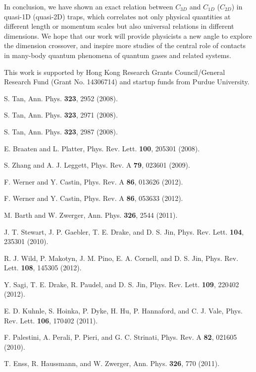 \documentclass[twocolumn, prl]{revtex4}
\begin{document}
In conclusion, we have shown an exact relation between $C_{3D}$ and $C_{1D}$ ($C_{2D}$) in quasi-1D (quasi-2D) traps, which correlates not only physical quantities at different length or momentum scales but also universal relations in different dimensions.  We hope that our work will provide physicists a new angle to explore the dimension crossover, and inspire more studies of the central role of contacts in many-body quantum phenomena of quantum gases and related systems.


This work is supported by Hong Kong Research Grants Council/General Research Fund (Grant No. 14306714) and startup funds from Purdue University.


\begin{thebibliography}{99}


 S. Tan, {Ann. Phys.} {\bf 323}, 2952 (2008).

 S. Tan, {Ann. Phys.} {\bf 323}, 2971 (2008).

 S. Tan, {Ann. Phys.} {\bf 323}, 2987 (2008).

 E. Braaten and L. Platter, {Phys. Rev. Lett.} {\bf 100}, 205301 (2008).

 S. Zhang and  A. J. Leggett, {Phys. Rev. A} {\bf 79}, 023601 (2009).

 F. Werner and Y. Castin, {Phys. Rev. A} {\bf 86}, 013626 (2012).

 F. Werner and Y. Castin, {Phys. Rev. A} {\bf 86}, 053633 (2012).

 M. Barth and W. Zwerger, {Ann. Phys.} {\bf 326}, 2544 (2011).

 J. T. Stewart, J. P. Gaebler, T. E. Drake, and D. S. Jin, {Phys. Rev. Lett.} {\bf 104}, 235301 (2010).

  R. J. Wild, P. Makotyn, J. M. Pino, E. A. Cornell, and D. S. Jin, {Phys. Rev. Lett.} {\bf 108}, 145305 (2012).

 Y. Sagi, T. E. Drake, R. Paudel, and D. S. Jin, {Phys. Rev. Lett.} {\bf 109}, 220402 (2012).

  E. D. Kuhnle, S. Hoinka, P. Dyke, H. Hu, P. Hannaford, and C. J. Vale,  {Phys. Rev. Lett.} {\bf 106}, 170402 (2011).

 F. Palestini, A. Perali, P. Pieri, and G. C. Strinati, {Phys. Rev. A} {\bf 82}, 021605 (2010).

 T. Enss, R. Haussmann, and W. Zwerger, {Ann. Phys.} {\bf 326}, 770 (2011).


\end{thebibliography}
\end{document}
